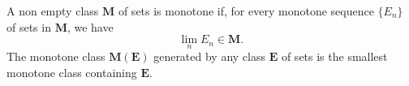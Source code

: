 A non empty class $\mathbf{M}$ of sets is monotone if, for every monotone sequence $\{E_n\}$ of sets in $\mathbf{M}$, we have
$$\lim_n E_n \in \mathbf{M}.$$
The monotone class $\mathbf{M}(\mathbf{E})$ generated by any class $\mathbf{E}$ of sets is the smallest monotone class containing $\mathbf{E}$.
